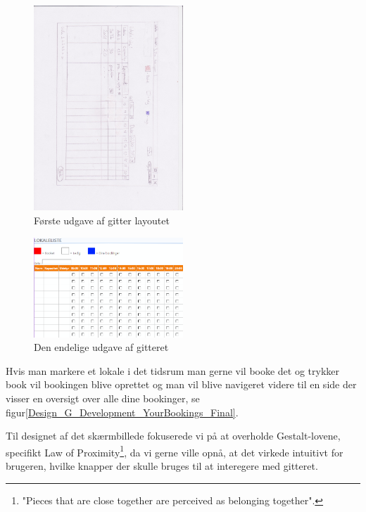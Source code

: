 \begin{figure}[h!]
  \centering
    \includegraphics[width=0.5\textwidth, angle=90]{Appendix/GUI-Prototype/PaperMockup/LokaleListe_001}
  \caption{Første udgave af gitter layoutet}
\label{Design_G_Development_FirstGrid}
\end{figure}

\begin{figure}[h!]
  \centering
    \includegraphics[width=0.5\textwidth]{Appendix/GUI-Prototype/DigitalMockup/GridEksempel}
  \caption{Den endelige udgave af gitteret}
\label{Design_G_Development_FinalGrid}
\end{figure}

Hvis man markere et lokale i det tidsrum man gerne vil booke det og trykker book vil bookingen blive oprettet og man vil blive navigeret videre til en side der visser en oversigt over alle dine bookinger, se figur\ref{Design_G_Development_YourBookings_Final}. 

Til designet af det skærmbillede fokuserede vi på at overholde Gestalt-lovene\cite[s. 68]{SL_UID}, specifikt Law of Proximity\footnote{"Pieces that are close together are perceived as belonging together".}, da vi gerne ville opnå, at det virkede intuitivt for brugeren, hvilke knapper der skulle bruges til at interegere med gitteret. 

